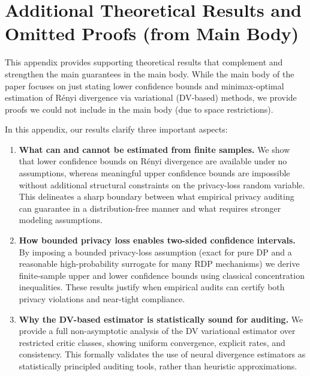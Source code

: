 \documentclass{article}
\theoremstyle{plain}
\theoremstyle{definition}
\theoremstyle{remark}
\begin{document}
\section{Additional Theoretical Results and Omitted Proofs (from Main Body)}


This appendix provides supporting theoretical results that complement and strengthen the main guarantees in the main body.
While the main body of the paper focuses on just stating lower confidence bounds and minimax-optimal estimation of R\'enyi divergence via
variational (DV-based) methods, we provide proofs we could not include
in the main body (due to space restrictions).

In this appendix, our results clarify three important aspects:

\begin{enumerate}
    \item \textbf{What can and cannot be estimated from finite samples.}
    We show that lower confidence bounds on R\'enyi divergence are available under no assumptions, whereas
    meaningful upper confidence bounds are impossible without additional structural constraints on the privacy-loss random variable.
    This delineates a sharp boundary between what empirical privacy auditing can guarantee in a distribution-free manner and
    what requires stronger modeling assumptions.

    \item \textbf{How bounded privacy loss enables two-sided confidence intervals.}
    By imposing a bounded privacy-loss assumption (exact for pure DP and a reasonable high-probability surrogate for many RDP mechanisms)
    we derive finite-sample upper and lower confidence bounds using classical concentration inequalities.
    These results justify when empirical audits can certify both privacy violations and near-tight compliance.

    \item \textbf{Why the DV-based estimator is statistically sound for auditing.}
    We provide a full non-asymptotic analysis of the DV variational estimator over restricted critic classes,
    showing uniform convergence, explicit rates, and consistency.
    This formally validates the use of neural divergence estimators as statistically principled auditing tools,
    rather than heuristic approximations.
\end{enumerate}
\end{document}
